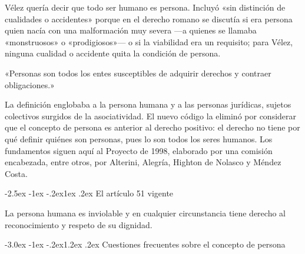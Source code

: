 \documentclass[12pt,oneside]{book}
\makeatletter
\renewcommand\section{\@startsection{section}{1}{\z@}%
  {-3.0ex \@plus -1ex \@minus -.2ex}{1.2ex \@plus .2ex}%
  {\normalfont\large\bfseries\color{acento}}}
\renewcommand\subsection{\@startsection{subsection}{2}{\z@}%
  {-2.5ex \@plus -1ex \@minus -.2ex}{1ex \@plus .2ex}%
  {\normalfont\normalsize\bfseries}}
\makeatother
\begin{document}
Vélez quería decir que todo ser humano es persona. Incluyó «sin distinción de cualidades o accidentes» porque en el derecho romano se discutía si era persona quien nacía con una malformación muy severa ---a quienes se llamaba «monstruosos» o «prodigiosos»--- o si la viabilidad era un requisito; para Vélez, ninguna cualidad o accidente quita la condición de persona.

\begin{nota}
«Personas son todos los entes susceptibles de adquirir derechos y contraer obligaciones.»
\end{nota}

La definición englobaba a la persona humana y a las personas jurídicas, sujetos colectivos surgidos de la asociatividad. El nuevo código la eliminó por considerar que el concepto de persona es anterior al derecho positivo: el derecho no tiene por qué definir quiénes son personas, pues lo son todos los seres humanos. Los fundamentos siguen aquí al Proyecto de 1998, elaborado por una comisión encabezada, entre otros, por Alterini, Alegría, Highton de Nolasco y Méndez Costa.

\subsection{El artículo 51 vigente}

\begin{regla}
La persona humana es inviolable y en cualquier circunstancia tiene derecho al reconocimiento y respeto de su dignidad.
\end{regla}

\section{Cuestiones frecuentes sobre el concepto de persona}
\end{document}
